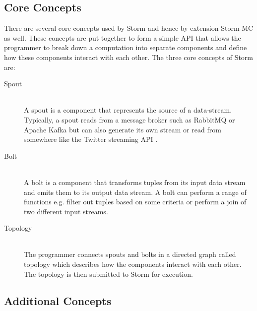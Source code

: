 \documentclass[bsc,logo,frontabs,twoside,singlespacing,normalheadings,parskip]{infthesis}\usepackage[]{graphicx}\usepackage[]{color}
\begin{document}
\subsection{Core Concepts}

There are several core concepts used by Storm and hence by extension Storm-MC as well. These concepts are put together to form a simple API that allows the programmer to break down a computation into separate components and define how these components interact with each other. The three core concepts of Storm are:

\begin{description}
  \item[Spout] \hfill \\
  A spout is a component that represents the source of a data-stream. Typically, a spout reads from a message broker such as RabbitMQ \cite{RabbitMQ} or Apache Kafka but can also generate its own stream or read from somewhere like the Twitter streaming API \citep{TwitterStreaming}.
  \item[Bolt] \hfill \\
  A bolt is a component that transforms tuples from its input data stream and emits them to its output data stream. A bolt can perform a range of functions e.g. filter out tuples based on some criteria or perform a join of two different input streams.
  \item[Topology] \hfill \\
  The programmer connects spouts and bolts in a directed graph called topology which describes how the components interact with each other. The topology is then submitted to Storm for execution.
\end{description}

\subsection{Additional Concepts}
\end{document}
